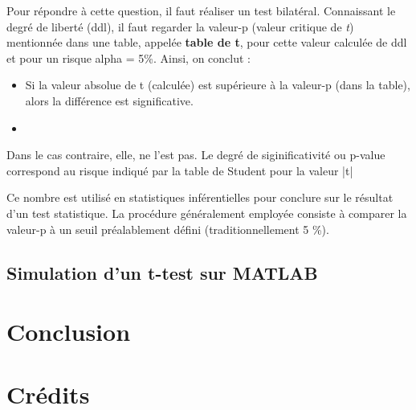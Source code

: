 \documentclass[10pt, oneside, a4paper]{article}
\begin{document}
Pour répondre à cette question, il faut réaliser un test bilatéral. Connaissant le degré de liberté (ddl), il faut regarder la valeur-p (valeur critique de \textit{t}) mentionnée dans une table, appelée \textbf{table de t}, pour cette valeur calculée de ddl et pour un risque alpha = 5\%. Ainsi, on conclut :
\begin{itemize}
\item Si la valeur absolue de t (calculée) est supérieure à la valeur-p (dans la table), alors la différence est significative. 
\item 
\end{itemize}

Dans le cas contraire, elle, ne l’est pas. Le degré de siginificativité ou p-value correspond au risque indiqué par la table de Student pour la valeur |t|

Ce nombre est utilisé en statistiques inférentielles pour conclure sur le résultat d’un test statistique. La procédure généralement employée consiste à comparer la valeur-p à un seuil préalablement défini (traditionnellement 5 \%). 
\subsection{Simulation d'un t-test sur MATLAB}


\newpage
\section{Conclusion}


\newpage
\pagebreak
{}
\section*{Crédits}
\end{document}
